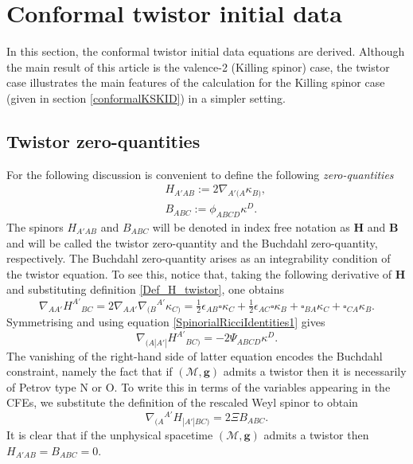 \documentclass[10pt,a4paper]{article}
\theoremstyle{plain}
\def\bmg{{\bm g}}
\def\bmB{{\bm B}}
\def\bmH{{\bm H}}
\begin{document}
  \section{Conformal twistor initial data}
  \label{conformalTwistorKID}
  In this section, the conformal twistor initial data equations are
  derived. Although the main result of this article is the valence-2 (Killing spinor) case, the twistor case illustrates the main features of the calculation for the Killing spinor case (given in section \ref{conformalKSKID}) in a simpler setting.
\subsection{Twistor zero-quantities}
\label{Sec:TwistorZeroQuantities}

For the following discussion is convenient to define the following
\emph{zero-quantities}
\begin{subequations}
  \begin{eqnarray}
   && H_{A'AB} := 2
    \nabla_{A'(A}\kappa_{B)},\label{Def_H_twistor}\\ && B_{ABC}
    := \phi_{ABCD}\kappa^D.\label{Def_B_twistor}
    \end{eqnarray}
\end{subequations}
The spinors $H_{A'AB}$ and $B_{ABC}$ will be denoted in index free
notation as $\bmH$ and $\bmB$ and will be called the twistor
zero-quantity and the Buchdahl zero-quantity, respectively.  The
Buchdahl zero-quantity arises as an integrability condition of the
twistor equation.  To see this, notice that, taking the following
derivative of $\bmH$ and substituting definition
\eqref{Def_H_twistor}, one obtains
  \begin{equation}\label{curl_H_twistor}
  \nabla_{AA'}H^{A'}{}_{BC}= 2 \nabla_{AA'}\nabla_{(B}{}^{A'}\kappa
  _{C)} = \tfrac{1}{2} \epsilon _{AB} \square \kappa _{C}  +
  \tfrac{1}{2}  \epsilon _{AC} \square \kappa _{B} +
  \square_{BA}\kappa _{C} + \square_{CA}\kappa _{B}.
  \end{equation}
  Symmetrising and using equation \eqref{SpinorialRicciIdentities1} gives
  \[
  \nabla_{(A|A'|}H^{A'}{}_{BC)}= - 2\Psi_{ABCD}\kappa^D.
  \]
  The vanishing of the right-hand side of latter equation encodes the
  Buchdahl constraint, namely the fact that if $(\mathcal{M},\bmg)$
  admits a twistor then it is necessarily of Petrov type N or O. To
  write this in terms of the variables appearing in the CFEs,
  we substitute the definition of the rescaled Weyl spinor
  to obtain
  \begin{equation}\label{Curl_H_sym_toB_twistor}
  \nabla_{(A}{}^{A'}H_{|A'|BC)} = 2\Xi B_{ABC}.
  \end{equation}
  It is clear that if the unphysical spacetime
  $(\mathcal{M},\bmg)$ admits a twistor  then $H_{A'AB}=B_{ABC}=0$. 
  
\end{document}
